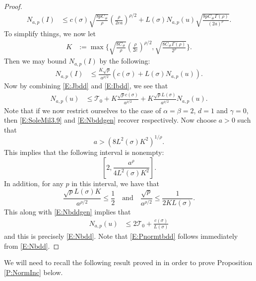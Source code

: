 \documentclass[12pt]{report}
\theoremstyle{plain}
\theoremstyle{definition}
\numberwithin{equation}{section}
\begin{document}
\begin{proof}
	\begin{align}
	N_{a,p}(I) &\le  c(\sigma)\sqrt{\frac{8pC_{\#}  }{\rho}} \left(\frac{\rho}{2ea}\right)^{\rho/2} +  L(\sigma)N_{a,p}(u) \sqrt{\frac{8pC_{\#} \Gamma\left( \rho \right)}{(2a)^\rho} }. \label{E:SoleMil3.9}
	\end{align}
	To simplify things, we now let 
	\begin{align*}
	K&:= \max\Bigg\{\sqrt{\frac{8C_{\#}  }{\rho}} \left(\frac{\rho}{2e}\right)^{\rho/2}, \sqrt{\frac{8C_{\#} \Gamma\left( \rho \right) }{2^{\rho}}}  \Bigg\}.
	\end{align*}
	Then we may bound $N_{a,p}(I)$ by the following:
	\begin{align}
	\label{E:Ibdd}
	N_{a,p}(I) &\le\frac{K \sqrt{p}}{a^{\rho/2}}\left( c(\sigma) + L(\sigma)N_{a,p}(u) \right).
	\end{align}
	Now by combining \eqref{E:Jbdd} and \eqref{E:Ibdd}, we see that 
	\begin{align}
	N_{a,p}(u) & \le \mathcal{T}_0   + K\frac{\sqrt{p}c(\sigma)}{a^{\rho/2} }  + K  \frac{\sqrt{p}L(\sigma)}{a^{\rho/2}} N_{a,p}(u). \label{E:Nbddgen}
	\end{align}
	Note that if we now restrict ourselves to the case of $\alpha = \beta = 2$, $d=1$ and $\gamma =0$, then \eqref{E:SoleMil3.9} and \eqref{E:Nbddgen} recover \cite[(3.9) and (3.10)]{millet.sanz-sole:21:global} respectively. Now choose $a>0$ such that 
	\[
	a > \left( 8 L^2(\sigma)K^2\right)^{1/\rho}.
	\]
	This implies that the following interval is nonempty:
	\[
	\left[ 2, \frac{a^{\rho}}{4L^2(\sigma)K^2} \right].
	\]
	In addition, for any $p$ in this interval, we have that 
	\[
	\frac{\sqrt{p}L(\sigma)K}{a^{\rho/2}} \le \frac{1}{2} 
	\quad \text{and} \quad 
	\frac{\sqrt{p}}{a^{\rho/2}}  \le \frac{1}{2KL(\sigma)}.
	\]
	This along with \eqref{E:Nbddgen} implies that 
	\begin{align*}
	N_{a,p}(u) & \le 2 \mathcal{T}_0 + \frac{c(\sigma)}{L(\sigma)}
	\end{align*}
	and this is precisely \eqref{E:Nbdd}. Note that \eqref{E:Pnormtbdd} follows immediately from \eqref{E:Nbdd}.  
\end{proof}

We will need to recall the following result proved in \cite{chen.hu.ea:19:nonlinear} in order to prove Proposition \ref{P:NormInc} below. 
\end{document}
